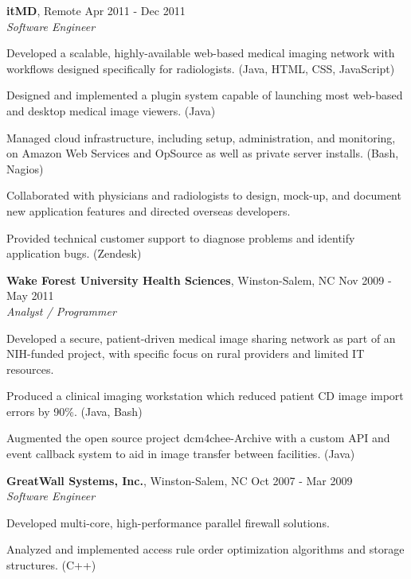 \documentclass[margin,line]{resume}
\begin{document}
\begin{resume}
  \textbf{itMD}, Remote \hfill Apr 2011 - Dec 2011\vspace{1mm}\\
  \textsl{Software Engineer}\\
  \vspace{-3mm}
  \begin{list2}
\item Developed a scalable, highly-available web-based medical imaging network with
  workflows designed specifically for radiologists. (Java, HTML, CSS,
  JavaScript)
\item Designed and implemented a plugin system capable of launching most web-based
  and desktop medical image viewers. (Java)
\item Managed cloud infrastructure, including setup, administration, and
  monitoring, on Amazon Web Services and OpSource as well as private server
  installs. (Bash, Nagios)
\item Collaborated with physicians and radiologists to design, mock-up, and
  document new application features and directed overseas developers.
\item Provided technical customer support to diagnose problems and identify
  application bugs. (Zendesk)
  \end{list2}

  \newpage

  \textbf{Wake Forest University Health Sciences}, Winston-Salem, NC \hfill Nov 2009 - May 2011\vspace{1mm}\\
  \textsl{Analyst / Programmer}\\
  \vspace{-3mm}
  \begin{list2}
\item Developed a secure, patient-driven medical image sharing network as part of
  an NIH-funded project, with specific focus on rural providers and limited
  IT resources.
\item Produced a clinical imaging workstation which reduced patient CD image import
  errors by 90\%. (Java, Bash)
\item Augmented the open source project dcm4chee-Archive with a custom API and
  event callback system to aid in image transfer between facilities. (Java)
  \end{list2}

  \textbf{GreatWall Systems, Inc.}, Winston-Salem, NC \hfill Oct 2007 - Mar 2009\vspace{1mm}\\
  \textsl{Software Engineer}\\
  \vspace{-3mm}
  \begin{list2}
\item Developed multi-core, high-performance parallel firewall solutions.
\item Analyzed and implemented access rule order optimization algorithms and storage
  structures. (C++)
  \end{list2}


\end{resume}
\end{document}
